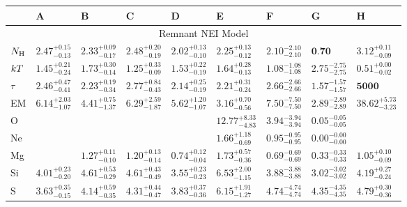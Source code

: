 \begin{tabular}{@{}lllllllll@{}}
\toprule
 & A & B & C & D & E & F & G & H \\
\midrule
\multicolumn{9}{c}{Remnant NEI Model} \\
\midrule
$N_{\mathrm{H}}$ & ${2.47}^{+0.15}_{-0.13}$ & ${2.33}^{+0.09}_{-0.17}$ & ${2.48}^{+0.20}_{-0.19}$ & ${2.02}^{+0.13}_{-0.10}$ & ${2.25}^{+0.13}_{-0.12}$ & ${2.10}^{-2.10}_{-2.10}$ & $\textbf{0.70}$ & ${3.12}^{+0.11}_{-0.09}$ \\ [0.5 em]
$k T$ & ${1.45}^{+0.21}_{-0.24}$ & ${1.73}^{+0.30}_{-0.14}$ & ${1.25}^{+0.33}_{-0.09}$ & ${1.53}^{+0.22}_{-0.19}$ & ${1.64}^{+0.28}_{-0.13}$ & ${1.08}^{-1.08}_{-1.08}$ & ${2.75}^{-2.75}_{-2.75}$ & ${0.51}^{+0.00}_{-0.02}$ \\ [0.5 em]
$\tau$ & ${2.46}^{+0.47}_{-0.41}$ & ${2.23}^{+0.19}_{-0.34}$ & ${2.77}^{+0.84}_{-0.43}$ & ${2.14}^{+0.25}_{-0.19}$ & ${2.21}^{+0.31}_{-0.24}$ & ${2.66}^{-2.66}_{-2.66}$ & ${1.57}^{-1.57}_{-1.57}$ & $\textbf{5000}$ \\ [0.5 em]
EM & ${6.14}^{+2.03}_{-1.07}$ & ${4.41}^{+0.75}_{-1.37}$ & ${6.29}^{+2.59}_{-1.87}$ & ${5.62}^{+1.20}_{-1.07}$ & ${3.16}^{+0.70}_{-0.56}$ & ${7.50}^{-7.50}_{-7.50}$ & ${2.89}^{-2.89}_{-2.89}$ & ${38.62}^{+5.73}_{-3.23}$ \\ [0.5 em]
O &      &      &      &      & ${12.77}^{+8.33}_{-4.83}$ & ${3.94}^{-3.94}_{-3.94}$ & ${0.05}^{-0.05}_{-0.05}$ &      \\ [0.5 em]
Ne &      &      &      &      & ${1.66}^{+1.18}_{-0.69}$ & ${0.95}^{-0.95}_{-0.95}$ & ${0.00}^{-0.00}_{-0.00}$ &      \\ [0.5 em]
Mg &      & ${1.27}^{+0.11}_{-0.10}$ & ${1.20}^{+0.13}_{-0.14}$ & ${0.74}^{+0.12}_{-0.04}$ & ${1.73}^{+0.57}_{-0.36}$ & ${0.69}^{-0.69}_{-0.69}$ & ${0.33}^{-0.33}_{-0.33}$ & ${1.05}^{+0.10}_{-0.09}$ \\ [0.5 em]
Si & ${4.01}^{+0.23}_{-0.20}$ & ${4.61}^{+0.53}_{-0.29}$ & ${4.61}^{+0.43}_{-0.49}$ & ${3.55}^{+0.23}_{-0.23}$ & ${6.53}^{+2.00}_{-1.15}$ & ${3.88}^{-3.88}_{-3.88}$ & ${3.02}^{-3.02}_{-3.02}$ & ${4.19}^{+0.27}_{-0.24}$ \\ [0.5 em]
S & ${3.63}^{+0.35}_{-0.15}$ & ${4.14}^{+0.59}_{-0.35}$ & ${4.31}^{+0.44}_{-0.47}$ & ${3.83}^{+0.37}_{-0.36}$ & ${6.15}^{+1.91}_{-1.27}$ & ${4.74}^{-4.74}_{-4.74}$ & ${4.35}^{-4.35}_{-4.35}$ & ${4.79}^{+0.30}_{-0.36}$ \\ [0.5 em]

\end{tabular}
